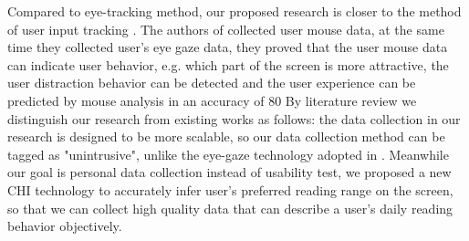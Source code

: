 \documentclass{sigchi}
\begin{document}
Compared to eye-tracking method, our proposed research is closer to the method of user input tracking \cite{navalpakkam2012mouse,huang2011no,lagun2011viewser,atterer2007tracking,10}.  The authors of \cite{navalpakkam2012mouse} collected user mouse data, at the same time they collected user’s eye gaze data, they proved that the user mouse data can indicate user behavior, e.g. which part of the screen is more attractive, the user distraction behavior can be detected and the user experience can be predicted by mouse analysis in an accuracy of 80%
By literature review we distinguish our research from existing works as follows: the data collection in our research is designed to be more scalable, so our data collection method can be tagged as "unintrusive", unlike the eye-gaze technology adopted in \cite{navalpakkam2012mouse,lagun2011viewser}. Meanwhile our goal is personal data collection instead of usability test, we proposed a new CHI technology to accurately infer user’s preferred reading range on the screen, so that we can collect high quality data that can describe a user’s daily reading behavior objectively. 
\end{document}
